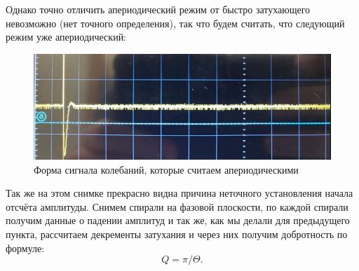 \documentclass[a4paper,12pt]{extarticle}
\begin{document}
Однако точно отличить апериодический режим от быстро затухающего невозможно (нет точного определения), так что будем считать, что следующий режим уже апериодический:
\begin{figure}[h!]
    \centering
    \includegraphics[width=0.8\linewidth]{aperiod.png}
    \caption{Форма сигнала колебаний, которые считаем апериодическими}
\end{figure}
Так же на этом снимке прекрасно видна причина неточного установления начала отсчёта амплитуды.
Снимем спирали на фазовой плоскости, по каждой спирали получим данные о падении амплитуд и так же, как мы делали для предыдущего пункта, рассчитаем декременты затухания и через них получим добротность по формуле:
\begin{equation}
    Q = \pi / \Theta.
\end{equation}
\end{document}
